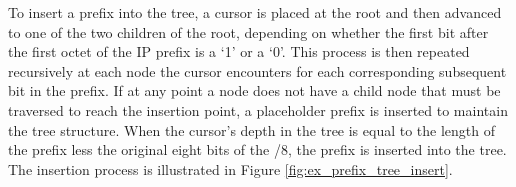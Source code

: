 To insert a prefix into the tree, a cursor is placed at the root and then
advanced to one of the two children of the root, depending on whether the first
bit after the first octet of the IP prefix is a `1' or a `0'. This process is
then repeated recursively at each node the cursor encounters for each
corresponding subsequent bit in the prefix. If at any point a node does not
have a child node that must be traversed to reach the insertion point, a
placeholder prefix is inserted to maintain the tree structure. When the
cursor's depth in the tree is equal to the length of the prefix less the
original eight bits of the /8, the prefix is inserted into the tree. The
insertion process is illustrated in Figure \ref{fig:ex_prefix_tree_insert}.

\begin{figure}

\end{figure}
